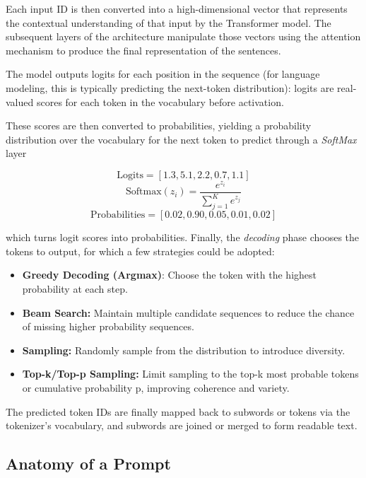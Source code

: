 Each input ID is then converted into a high-dimensional vector that represents the contextual understanding of that input by the Transformer model. The subsequent layers of the architecture manipulate those vectors using the attention mechanism to produce the final representation of the sentences. \cite{vaswani2017attention}

The model outputs logits for each position in the sequence (for language modeling, this is typically predicting the next-token distribution): logits are real-valued scores for each token in the vocabulary before activation.

These scores are then converted to probabilities, yielding a probability distribution over the vocabulary for the next token to predict through a \textit{SoftMax} layer

\[
\text{Logits} = [1.3, 5.1, 2.2, 0.7, 1.1]
\]
\[
\text{Softmax}(z_i) = \frac{e^{z_i}}{\sum_{j=1}^{K} e^{z_j}}
\]
\[
\text{Probabilities} = [0.02, 0.90, 0.05, 0.01, 0.02]
\]

which turns logit scores into probabilities.
Finally, the \textit{decoding} phase chooses the tokens to output, for which a few strategies could be adopted: \cite{radford2018improving}

\begin{itemize}
    \item \textbf{Greedy Decoding (Argmax)}: Choose the token with the highest probability at each step.
    \item \textbf{Beam Search:} Maintain multiple candidate sequences to reduce the chance of missing higher probability sequences.
    \item \textbf{Sampling:} Randomly sample from the distribution to introduce diversity.
    \item \textbf{Top-k/Top-p Sampling:} Limit sampling to the top-k most probable tokens or cumulative probability p, improving coherence and variety.
\end{itemize}

The predicted token IDs are finally mapped back to subwords or tokens via the tokenizer's vocabulary, and subwords are joined or merged to form readable text.





\subsection{Anatomy of a Prompt}
\label{sec:prompt-anatomy}

